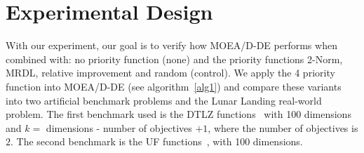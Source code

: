 \section{Experimental Design}

%


With our experiment, our goal is to verify how MOEA/D-DE performs when combined with: no priority function (none) and the priority functions 2-Norm, MRDL, relative improvement and random (control). We apply the 4 priority function into MOEA/D-DE (see algorithm~\ref{alg1}) and compare these variants into two artificial benchmark problems and the Lunar Landing real-world problem. The first benchmark used is the DTLZ functions~\cite{deb2005scalable} with 100 dimensions and $k =$ dimensions - number of objectives $+ 1$, where the number of objectives is $2$. The second benchmark is the UF functions~\cite{zhang2008multiobjective}, with 100 dimensions. 




